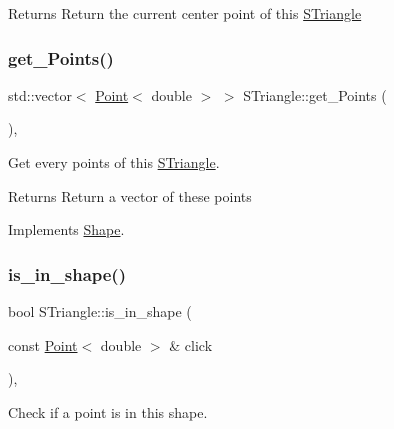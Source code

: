 \begin{DoxyReturn}{Returns}
Return the current center point of this \hyperlink{classSTriangle}{S\+Triangle} 
\end{DoxyReturn}
\mbox{\label{classSTriangle_a08f667453619b506b5c16745a9aa5ecf}} 
\subsubsection{\texorpdfstring{get\+\_\+\+Points()}{get\_Points()}}
{\footnotesize\ttfamily std\+::vector$<$ \hyperlink{classPoint}{Point}$<$ double $>$ $>$ S\+Triangle\+::get\+\_\+\+Points (\begin{DoxyParamCaption}{ }\end{DoxyParamCaption})\hspace{0.3cm}{\ttfamily [override]}, {\ttfamily [virtual]}}



Get every points of this \hyperlink{classSTriangle}{S\+Triangle}. 

\begin{DoxyReturn}{Returns}
Return a vector of these points 
\end{DoxyReturn}


Implements \hyperlink{classShape_add74a5c682840fa4a519242b1ddbd0b5}{Shape}.

\mbox{\label{classSTriangle_a5b55df6eb4af922521da69f69df77b42}} 
\subsubsection{\texorpdfstring{is\+\_\+in\+\_\+shape()}{is\_in\_shape()}}
{\footnotesize\ttfamily bool S\+Triangle\+::is\+\_\+in\+\_\+shape (\begin{DoxyParamCaption}\item[{const \hyperlink{classPoint}{Point}$<$ double $>$ \&}]{click }\end{DoxyParamCaption})\hspace{0.3cm}{\ttfamily [override]}, {\ttfamily [virtual]}}



Check if a point is in this shape. 


